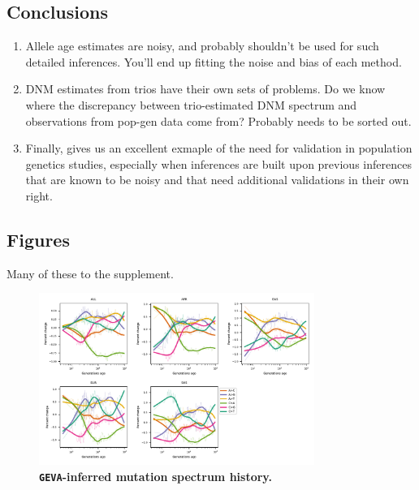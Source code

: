 \documentclass[]{article}
\newcommand{\GEVA}{\texttt{GEVA}\xspace}
\begin{document}
\subsection*{Conclusions}

\begin{enumerate}
    \item Allele age estimates are noisy, and probably shouldn't be used
        for such detailed inferences. You'll end up fitting the noise and
        bias of each method.
    \item DNM estimates from trios have their own sets of problems. Do we
        know where the discrepancy between trio-estimated DNM spectrum and
        observations from pop-gen data come from? Probably needs to be
        sorted out.
    \item Finally, \citet{wang2023human} gives us an excellent exmaple of the
        need for validation in population genetics studies, especially when
        inferences are built upon previous inferences that are known to be
        noisy and that need additional validations in their own right.
\end{enumerate}

\break

\subsection*{Figures}

Many of these to the supplement.

\begin{figure}[ht!]
    \centering
    \includegraphics[width=0.8\textwidth]{../plots/spectrum_history.geva.max_age.10000.pdf}
    \caption{
        \textbf{\GEVA-inferred mutation spectrum history.}
    }
    \label{fig:geva-spectra}
\end{figure}
\end{document}
